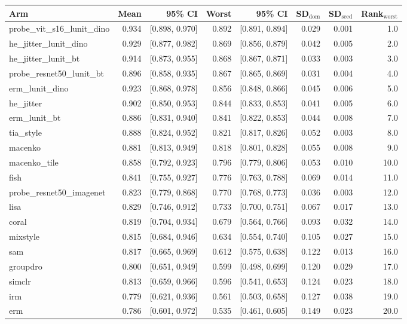 \begin{tabular}{lrrrrrrr}
\toprule
Arm & Mean & 95\% CI & Worst & 95\% CI & SD$_\text{dom}$ & SD$_\text{seed}$ & Rank$_\text{worst}$ \\
\midrule
probe\_vit\_s16\_lunit\_dino & 0.934 & [0.898, 0.970] & 0.892 & [0.891, 0.894] & 0.029 & 0.001 & 1.0 \\
he\_jitter\_lunit\_dino & 0.929 & [0.877, 0.982] & 0.869 & [0.856, 0.879] & 0.042 & 0.005 & 2.0 \\
he\_jitter\_lunit\_bt & 0.914 & [0.873, 0.955] & 0.868 & [0.867, 0.871] & 0.033 & 0.003 & 3.0 \\
probe\_resnet50\_lunit\_bt & 0.896 & [0.858, 0.935] & 0.867 & [0.865, 0.869] & 0.031 & 0.004 & 4.0 \\
erm\_lunit\_dino & 0.923 & [0.868, 0.978] & 0.856 & [0.848, 0.866] & 0.045 & 0.006 & 5.0 \\
he\_jitter & 0.902 & [0.850, 0.953] & 0.844 & [0.833, 0.853] & 0.041 & 0.005 & 6.0 \\
erm\_lunit\_bt & 0.886 & [0.831, 0.940] & 0.841 & [0.822, 0.853] & 0.044 & 0.008 & 7.0 \\
tia\_style & 0.888 & [0.824, 0.952] & 0.821 & [0.817, 0.826] & 0.052 & 0.003 & 8.0 \\
macenko & 0.881 & [0.813, 0.949] & 0.818 & [0.801, 0.828] & 0.055 & 0.008 & 9.0 \\
macenko\_tile & 0.858 & [0.792, 0.923] & 0.796 & [0.779, 0.806] & 0.053 & 0.010 & 10.0 \\
fish & 0.841 & [0.755, 0.927] & 0.776 & [0.763, 0.788] & 0.069 & 0.014 & 11.0 \\
probe\_resnet50\_imagenet & 0.823 & [0.779, 0.868] & 0.770 & [0.768, 0.773] & 0.036 & 0.003 & 12.0 \\
lisa & 0.829 & [0.746, 0.912] & 0.733 & [0.700, 0.751] & 0.067 & 0.017 & 13.0 \\
coral & 0.819 & [0.704, 0.934] & 0.679 & [0.564, 0.766] & 0.093 & 0.032 & 14.0 \\
mixstyle & 0.815 & [0.684, 0.946] & 0.634 & [0.554, 0.740] & 0.105 & 0.027 & 15.0 \\
sam & 0.817 & [0.665, 0.969] & 0.612 & [0.575, 0.638] & 0.122 & 0.013 & 16.0 \\
groupdro & 0.800 & [0.651, 0.949] & 0.599 & [0.498, 0.699] & 0.120 & 0.029 & 17.0 \\
simclr & 0.813 & [0.659, 0.966] & 0.596 & [0.541, 0.653] & 0.124 & 0.023 & 18.0 \\
irm & 0.779 & [0.621, 0.936] & 0.561 & [0.503, 0.658] & 0.127 & 0.038 & 19.0 \\
erm & 0.786 & [0.601, 0.972] & 0.535 & [0.461, 0.605] & 0.149 & 0.023 & 20.0 \\
\bottomrule
\end{tabular}
